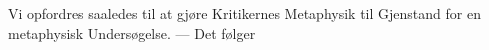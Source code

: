 \documentclass[12pt]{book}
\newcommand{\opage}[1]{\marginnote{\footnotesize\textit{[#1]}}}
\begin{document}
\opage{121} %
Vi opfordres saaledes til at gjøre Kritikernes Metaphysik til Gjenstand for en
metaphysisk Undersøgelse. --- Det følger
%
\end{document}
